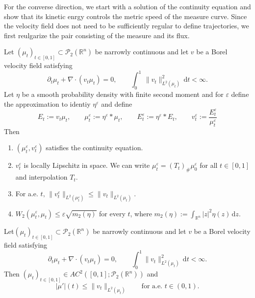 For the converse direction, we start with a solution of the continuity equation and show that its kinetic enrgy controls the metric speed of the measure curve. Since the velocity field does not need to be sufficiently regular to define trajectories, we first reulgarize the pair consisting of the measure and its flux.

\begin{lemma}
	Let $(\mu_t)_{t\in[0,1]}\subset\mathscr{P}_2(\mathbb{R}^n)$ be narrowly continuous and let $v$ be a Borel velocity field satisfying
	$$
	\partial_t\mu_t+\nabla\cdot(v_t\mu_t)=0,\qquad\int_0^1\ \lVert v_t\rVert_{L^2(\mu_t)}^2\,\mathrm dt<\infty.	
	$$
	Let $\eta$ be a smooth probability density with finite second moment and for $\varepsilon$ define the approximation to identiy $\eta^\varepsilon$ and define
	$$
	E_t:=v_t\mu_t,\qquad\mu_t^\varepsilon:=\eta^\varepsilon*\mu_t,\qquad E_t^\varepsilon:=\eta^\varepsilon*E_t,\qquad v_t^\varepsilon:=\frac{E_t^\varepsilon}{\mu_t^\varepsilon}
	$$
	Then
	\begin{enumerate}
		\item $(\mu_t^\varepsilon,v_t^\varepsilon)$ satisfies the continuity equation.
		\item $v_t^\varepsilon$ is locally Lipschitz in space. We can write $\mu_t^\varepsilon=(T_t)_\#\mu_0^\varepsilon$ for all $t\in[0,1]$ and interpolation $T_t$.
		\item For a.e. $t,\, \lVert v_t^\varepsilon\rVert_{L^2(\mu_t^\varepsilon)}\leq \lVert v_t\rVert_{L^2(\mu_t)}$.
		\item $W_2(\mu_t^\varepsilon,\mu_t)\leq\varepsilon\sqrt{m_2(\eta)}$ for every $t$, where $m_2(\eta):=\int_{\mathbb{R}^n}|z|^2\eta(z)\,\mathrm dz$.
	\end{enumerate}	
\end{lemma}

\begin{theorem}
 Let$(\mu_t)_{t\in[0,1]}\subset\mathscr{P}_2(\mathbb{R}^n)$ be narrowly continuous and let $v$ be a Borel velocity field satisfying
 $$
 \partial_t\mu_t+\nabla\cdot(v_t\mu_t)=0,\qquad \int_0^1 \lVert v_t\rVert_{L^2(\mu_t)}^2\,\mathrm dt<\infty.
 $$
 Then $(\mu_t)_{t\in[0,1]}\in AC^2([0,1];\mathscr{P}_2(\mathbb{R}^n))$ and 
 $$
 |\mu'|(t)\leq \lVert v_t\rVert_{L^2(\mu_t)}\qquad \text{for a.e. }t\in(0,1).
 $$
\end{theorem}

